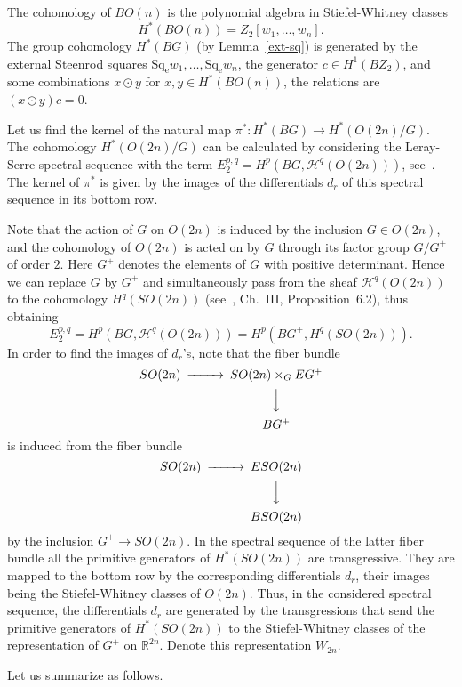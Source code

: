 \documentclass[12pt,a4paper]{amsart}
\theoremstyle{definition}
\theoremstyle{remark}
\begin{document}
The cohomology of $BO(n)$ is the polynomial algebra in Stiefel-Whitney classes
$$
H^*(BO(n)) = Z_2[w_1,\ldots, w_n].
$$
The group cohomology $H^*(BG)$ (by Lemma~\ref{ext-sq}) is generated by the external Steenrod squares $\operatorname{Sq_e} w_1,\ldots, \operatorname{Sq_e} w_n$, the generator $c\in H^1(BZ_2)$, and some combinations $x\odot y$ for $x,y\in H^*(BO(n))$, the relations are $(x\odot y)c=0$.

Let us find the kernel of the natural map $\pi^*: H^*(BG)\to H^*(O(2n)/G)$. The cohomology $H^*(O(2n)/G)$ can be calculated by considering the Leray-Serre spectral sequence with the term $E^{p,q}_2 = H^p(BG, \mathcal H^q(O(2n)))$, see~\cite[Section~11.4]{mcc2001}. The kernel of $\pi^*$ is given by the images of the differentials $d_r$ of this spectral sequence in its bottom row.

Note that the action of $G$ on $O(2n)$ is induced by the inclusion $G\in O(2n)$, and the cohomology of $O(2n)$ is acted on by $G$ through its factor group $G/G^+$ of order $2$. Here $G^+$ denotes the elements of $G$ with positive determinant. Hence we can replace $G$ by $G^+$ and simultaneously  pass from the sheaf $\mathcal H^q(O(2n))$ to the cohomology $H^q(SO(2n))$ (see~\cite{bro1982}, Ch.~III, Proposition~6.2), thus obtaining
$$
E^{p,q}_2 = H^p(BG, \mathcal H^q(O(2n))) = H^p(BG^+, H^q(SO(2n))).
$$
In order to find the images of $d_r$'s, note that the fiber bundle 
$$
\begin{CD}
SO(2n) @>>> SO(2n)\times_G EG^+\\
@. @VVV\\
@. BG^+
\end{CD}
$$
is induced from the fiber bundle 
$$
\begin{CD}
SO(2n) @>>> ESO(2n)\\
@. @VVV\\
@. BSO(2n)
\end{CD}
$$
by the inclusion $G^+\to SO(2n)$. In the spectral sequence of the latter fiber bundle all the primitive generators of $H^*(SO(2n))$ are transgressive. They are mapped to the bottom row by the corresponding differentials $d_r$, their images being the Stiefel-Whitney classes of $O(2n)$. Thus, in the considered spectral sequence, the differentials $d_r$ are generated by the transgressions that send the primitive generators of $H^*(SO(2n))$ to the Stiefel-Whitney classes of the representation of $G^+$ on $\mathbb R^{2n}$. Denote this representation $W_{2n}$.

Let us summarize as follows. 
\end{document}
